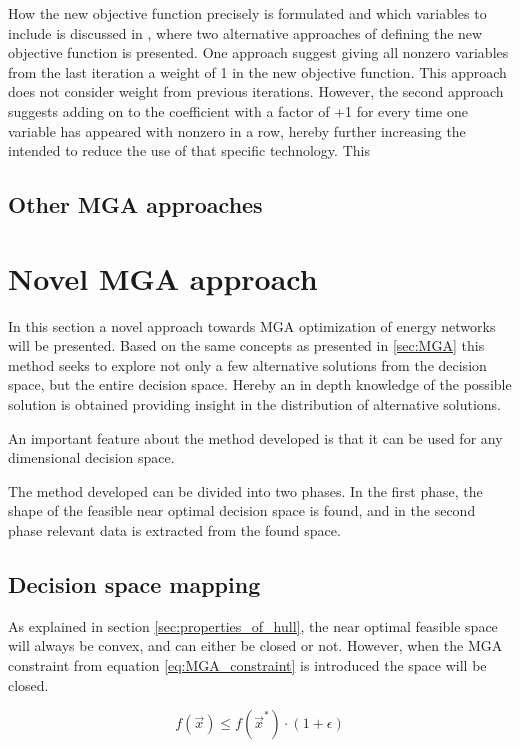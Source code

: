 How the new objective function precisely is formulated and which variables to include is discussed in \cite{DECAROLIS2016}, where two alternative approaches of defining the new objective function is presented. One approach suggest giving all nonzero variables from the last iteration a weight of 1 in the new objective function. This approach does not consider weight from previous iterations. However, the second approach suggests adding on to the coefficient with a factor of +1 for every time one variable has appeared with nonzero in a row, hereby further increasing the intended to reduce the use of that specific technology. This 



\subsection{Other MGA approaches}

\section{Novel MGA approach}

In this section a novel approach towards MGA optimization of energy networks will be presented. Based on the same concepts as presented in \ref{sec:MGA} this method seeks to explore not only a few alternative solutions from the decision space, but the entire decision space. Hereby an in depth knowledge of the possible solution is obtained providing insight in the distribution of alternative solutions.

An important feature about the method developed is that it can be used for any dimensional decision space. 

The method developed can be divided into two phases. In the first phase, the shape of the feasible near optimal decision space is found, and in the second phase relevant data is extracted from the found space. 

\subsection{Decision space mapping}
As explained in section \vref{sec:properties_of_hull}, the near optimal feasible space will always be convex, and can either be closed or not. However, when the MGA constraint from equation \vref{eq:MGA_constraint} is introduced the space will be closed. 

\begin{equation}\label{eq:MGA_constraint}
f(\vec{x}) \leqslant f(\vec{x}^*) \cdot (1+\epsilon)
\end{equation}

